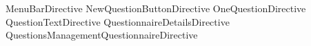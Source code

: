 MenuBarDirective
NewQuestionButtonDirective
OneQuestionDirective
QuestionTextDirective
QuestionnaireDetailsDirective
QuestionsManagementQuestionnaireDirective